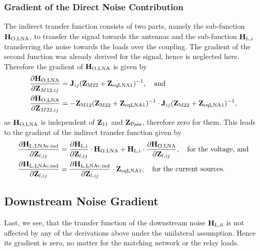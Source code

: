 \subsubsection{Gradient of the Direct Noise Contribution}
The indirect transfer function consists of two parts, namely the sub-function $\mathbf{H}_\text{O,LNA}$, to transfer the signal towards the antennas and the  sub-function $\mathbf{H}_{\text{L},i}$ transferring the noise towards the loads over the coupling.
The gradient of the second function was already derived for the signal, hence is neglected here.
Therefore the gradient of $\mathbf{H}_\text{O,LNA}$ is given by
\begin{align}\label{eq:lnavind_grad12}
\frac{\partial\mathbf{H}_\text{O,LNA}}{\partial\mathbf{Z}_{M12,ij}} &= 
	\mathbf{J}_{ij}(\mathbf{Z}_\text{M22}+\mathbf{Z}_{\text{eqLNA1}})^{-1},\quad\text{and}\\\label{eq:lnavind_grad22}
\frac{\partial\mathbf{H}_\text{O,LNA}}{\partial\mathbf{Z}_{M22,ij}} &= -
	\mathbf{Z}_\text{M12}(\mathbf{Z}_\text{M22}+\mathbf{Z}_{\text{eqLNA1}})^{-1}\cdot
	\mathbf{J}_{ij}(\mathbf{Z}_\text{M22}+\mathbf{Z}_{\text{eqLNA1}})^{-1},
\end{align}
as $\mathbf{H}_\text{O,LNA}$ is independent of $\mathbf{Z}_{11}$ and $\mathbf{Z}_\text{Pass}$, therefore zero for them.
This leads to the gradient of the indirect transfer function given by
\begin{align}\label{eq:lnaind_grad}
\frac{\partial\mathbf{H}_\text{L,LNAv,ind}}{\partial\mathbf{Z}_{l,ij}} &= 
	\frac{\partial\mathbf{H}_\text{L,i}}{\partial\mathbf{Z}_{l,ij}}\cdot\mathbf{H}_\text{O,LNA}+
	\mathbf{H}_\text{L,i}\cdot\frac{\partial\mathbf{H}_\text{O,LNA}}{\partial\mathbf{Z}_{l,ij}},
	\quad\text{for the voltage, and}\\
\frac{\partial\mathbf{H}_\text{L,LNAc,ind}}{\partial\mathbf{Z}_{l,ij}} &= 
	\frac{\partial\mathbf{H}_\text{L,LNAv,ind}}{\partial\mathbf{Z}_{l,ij}}\cdot\mathbf{Z}_{\text{eqLNA1}},
	\quad\text{for the current sources}.
\end{align}

\subsection{Downstream Noise Gradient}
\label{sec:down_noise_grad}
Last, we see, that the transfer function of the downstream noise $\mathbf{H}_{\text{L},\tilde{n}}$ is not affected by any of the derivations above under the unilateral assumption.
Hence its gradient is zero, no matter for the matching network or the relay loads.


